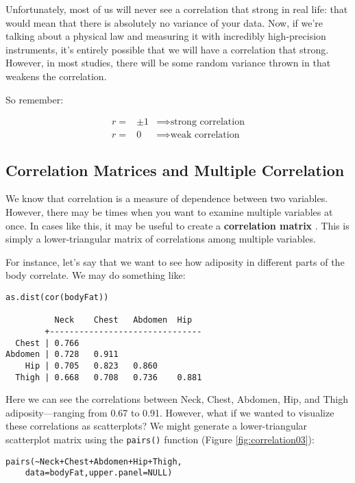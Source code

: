 Unfortunately, most of us will never see a correlation that strong in real life: that would mean that there is absolutely no variance of your data. Now, if we're talking about a physical law and measuring it with incredibly high-precision instruments, it's entirely possible that we will have a correlation that strong. However, in most studies, there will be some random variance thrown in that weakens the correlation.

So remember:

\begin{eqnarray*}
r=& \pm1 &\implies \text{strong correlation} \\
r=& 0 &\implies \text{weak correlation}
\end{eqnarray*}


\subsection{Correlation Matrices and Multiple Correlation}
We know that correlation is a measure of dependence between two variables. However, there may be times when you want to examine multiple variables at once. In cases like this, it may be useful to create a \textbf{correlation matrix} . This is simply a lower-triangular matrix of correlations among multiple variables.

For instance, let's say that we want to see how adiposity in different parts of the body correlate. We may do something like:

\begin{framed}
\begin{Verbatim}[samepage=TRUE]
as.dist(cor(bodyFat))

          Neck    Chest   Abdomen  Hip
        +-------------------------------
  Chest | 0.766 
Abdomen | 0.728   0.911
    Hip | 0.705   0.823   0.860  
  Thigh | 0.668   0.708   0.736    0.881
\end{Verbatim}
\end{framed}

Here we can see the correlations between Neck, Chest, Abdomen, Hip, and Thigh adiposity---ranging from 0.67 to 0.91. However, what if we wanted to visualize these correlations as scatterplots? We might generate a lower-triangular scatterplot matrix using the \verb|pairs()| function (Figure \ref{fig:correlation03}):

\begin{framed}
\begin{Verbatim}[samepage=TRUE]
pairs(~Neck+Chest+Abdomen+Hip+Thigh,
    data=bodyFat,upper.panel=NULL)
\end{Verbatim}
\end{framed}

